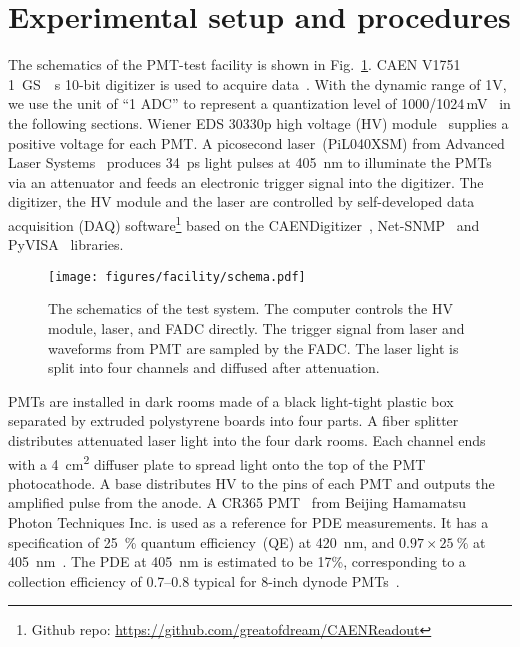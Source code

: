 \section{Experimental setup and procedures}
\label{SetUp}
The schematics of the PMT-test facility is shown in Fig.~\ref{fig:facility}. CAEN V1751 \SI{1}{GS \per s} 10-bit digitizer is used to acquire data~\cite{CAENV1751}. With the dynamic range of 1V, we use the unit of ``1 ADC''  to represent a quantization level of 1000/1024\,mV~\cite{JUNOPrototype} in the following sections. Wiener EDS 30330p high voltage (HV) module~\cite{WIENERHV} supplies a positive voltage for each PMT. A picosecond laser~(PiL040XSM) from Advanced Laser Systems~\cite{NTKLaser} produces \SI{34}{ps} light pulses at \SI{405}{nm} to illuminate the PMTs via an attenuator and feeds an electronic trigger signal into the digitizer. The digitizer, the HV module and the laser are controlled by self-developed data acquisition (DAQ) software\footnote{Github repo: \url{https://github.com/greatofdream/CAENReadout}} based on the CAENDigitizer~\cite{CAENLIB}, Net-SNMP~\cite{SNMP} and PyVISA~\cite{VISA} libraries.

\begin{figure}[!htbp]
    \centering
    \texttt{[image: figures/facility/schema.pdf]}
    \caption{The schematics of the test system. The computer controls the HV module, laser, and FADC directly. The trigger signal from laser and waveforms from PMT are sampled by the FADC. The laser light is split into four channels and diffused after attenuation.}
    \label{fig:facility}
\end{figure}

PMTs are installed in dark rooms made of a black light-tight plastic box separated by extruded polystyrene boards into four parts. A fiber splitter distributes attenuated laser light into the four dark rooms. Each channel ends with a \SI{4}{cm\tothe{2}} diffuser plate to spread light onto the top of the PMT photocathode.
A base distributes HV to the pins of each PMT and outputs the amplified pulse from the anode. A CR365 PMT~\cite{BJBS} from Beijing Hamamatsu Photon Techniques Inc. is used as a reference for PDE measurements.  It has a specification of \SI{25}{\percent} quantum efficiency~(QE) at \SI{420}{nm}, and \(0.97 \times \SI{25}{\percent}\) at \SI{405}{nm}~\cite{HAMAMATSUManual}. The PDE at \SI{405}{nm} is estimated to be 17\%, corresponding to a collection efficiency of 0.7--0.8 typical for 8-inch dynode PMTs~\cite{R5912MOD,RCESpotlight,WANG2012113}.

